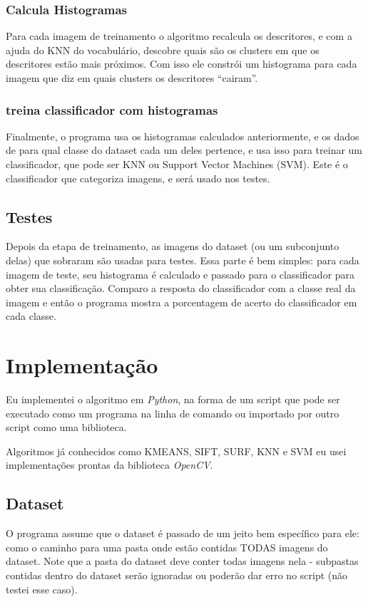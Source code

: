 \subsubsection{Calcula Histogramas}
Para cada imagem de treinamento o algoritmo recalcula os descritores, e com a ajuda do KNN do vocabulário,
descobre quais são os clusters em que os descritores estão mais próximos. Com isso ele constrói um
histograma para cada imagem que diz em quais clusters os descritores ``cairam''.

\subsubsection{treina classificador com histogramas}
Finalmente, o programa usa os histogramas calculados anteriormente, e os dados de para qual 
classe do dataset cada um deles pertence, e usa isso para treinar um classificador, que pode
ser KNN ou Support Vector Machines (SVM). Este é o classificador que categoriza imagens, e será
usado nos testes.

\subsection{Testes}
Depois da etapa de treinamento, as imagens do dataset (ou um subconjunto delas) que sobraram 
são usadas para testes. Essa parte é bem simples: para cada imagem de teste, seu histograma
é calculado e passado para o classificador para obter sua classificação. Comparo a resposta
do classificador com a classe real da imagem e então o programa mostra a porcentagem de
acerto do classificador em cada classe.

\section{Implementação}
Eu implementei o algoritmo em \emph{Python}, na forma de um script que pode ser executado
como um programa na linha de comando ou importado por outro script como uma biblioteca.

Algoritmos já conhecidos como KMEANS, SIFT, SURF, KNN e SVM eu usei implementações prontas
da biblioteca \emph{OpenCV}.

\subsection{Dataset}
O programa assume que o dataset é passado de um jeito bem específico para ele: como o caminho para
uma pasta onde estão contidas TODAS imagens do dataset. Note que a pasta do dataset 
deve conter todas imagens nela - subpastas contidas dentro do dataset serão ignoradas ou 
poderão dar erro no script (não testei esse caso).

